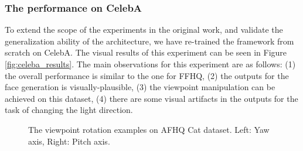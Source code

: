 




\subsubsection{The performance on CelebA}
To extend the scope of the experiments in the original work, and validate the generalization ability of the architecture, we have re-trained the framework from scratch on CelebA. The visual results of this experiment can be seen in Figure \ref{fig:celeba_results}. The main observations for this experiment are as follows: (1) the overall performance is similar to the one for FFHQ, (2) the outputs for the face generation is visually-plausible, (3) the viewpoint manipulation can be achieved on this dataset, (4) there are some visual artifacts in the outputs for the task of changing the light direction.


\begin{figure}[h!]%
    \centering
    \qquad
    \caption{The viewpoint rotation examples on AFHQ Cat dataset. Left: Yaw axis, Right: Pitch axis.}%
    \label{fig:afhq_view}%
\end{figure}

